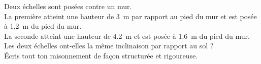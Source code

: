 %
%
    Deux échelles sont posées contre un mur.\\
    La première atteint une hauteur de \qty{3}{m} par rapport au pied du mur et est posée à \qty{1,2}{m} du pied du mur.\\
    La seconde atteint une hauteur de \qty{4,2}{m} et est posée à \qty{1,6}{m} du pied du mur.\\
    Les deux échelles ont-elles la même inclinaison par rapport au sol ? \\
    Écris tout ton raisonnement de façon structurée et rigoureuse.
